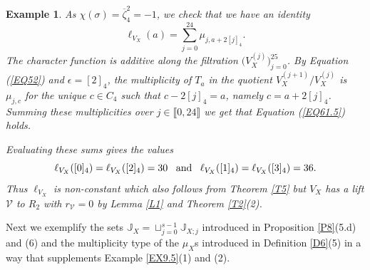 \documentclass[11pt]{amsart}
\newtheorem{ex}[theorem]{Example}
\begin{document}
\begin{ex}
As $\chi(\sigma)=\overline{\zeta}_4^2=-1$, we check that we have an identity
\begin{equation}\label{EQ61.5}
\ell_{V_X}(a)=\sum_{j=0}^{24} \mu_{j,a+2[j]_4}.
\end{equation}
The character function is additive along the filtration
$\bigl(V_X^{(j)}\bigr)_{j=0}^{25}$. By Equation (\ref{EQ52}) and $\epsilon=[2]_4$, the multiplicity of $T_a$ in the quotient
$V_X^{(j+1)}/V_X^{(j)}$ is $\mu_{j,c}$ for the unique $c\in C_4$ such that
$c-2[j]_4=a$, namely $c=a+2[j]_4$. Summing these multiplicities over
$j\in\llbracket0,24\rrbracket$ we get that Equation (\ref{EQ61.5}) holds.

Evaluating these sums gives the values
$$\ell_{V_X}([0]_4)=\ell_{V_X}([2]_4)=30\;\;\;\textup{and}\;\;\;\ell_{V_X}([1]_4)=\ell_{V_X}([3]_4)=36.$$
Thus $\ell_{V_X}$ is non-constant which also follows from Theorem \ref{T5} but $V_X$ has a lift $\mathcal V$ to $R_2$ with $r_{\mathcal V}=0$ by Lemma \ref{L1} and Theorem \ref{T2}(2).
\end{ex}

Next we exemplify the sets $\mathbb J_X=\sqcup_{j=0}^{s-1} \mathbb J_{X;j}$ introduced in Proposition \ref{P8}(5.d) and (6) and the multiplicity type of the $\mu_X$s introduced in Definition \ref{D6}(5) in a way that supplements Example \ref{EX9.5}(1) and (2).
\end{document}
